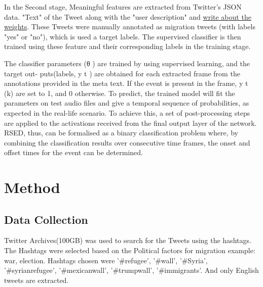 In the Second stage, Meaningful features are extracted from Twitter's JSON data. "Text" of the Tweet along with the "user description" and \underline{write about the weights}. These Tweets were manually annotated as migration tweets (with labels "yes" or "no"), which is used a target labels. The supervised classifier is then trained
using these feature and their corresponding labels in the training stage.

The classifier parameters (θ ) are trained by using supervised learning, and the target out-
puts(labels, y t ) are obtained for each extracted frame from the annotations provided in
the meta text. If the event is present in the frame, y t (k) are set to 1, and 0 otherwise. To
predict, the trained model will fit the parameters on test audio files and give a temporal
sequence of probabilities, as expected in the real-life scenario. To achieve this, a set of
post-processing steps are applied to the activations received from the final output layer of
the network.
RSED, thus, can be formalised as a binary classification problem where, by combining
the classification results over consecutive time frames, the onset and offset times for the
event can be determined.


\section{Method}
\subsection{Data Collection}
Twitter Archives(100GB) was used to search for the Tweets using the hashtags. The Hashtags were selected based on the Political factors for migration
example: war, election. Hashtags chosen were ’\#refugee’, ’\#wall’, ’\#Syria’, ’\#syrianrefugee’, ’\#mexicanwall’, ’\#trumpwall’, ’\#immigrants’. And only English tweets are
extracted. 
